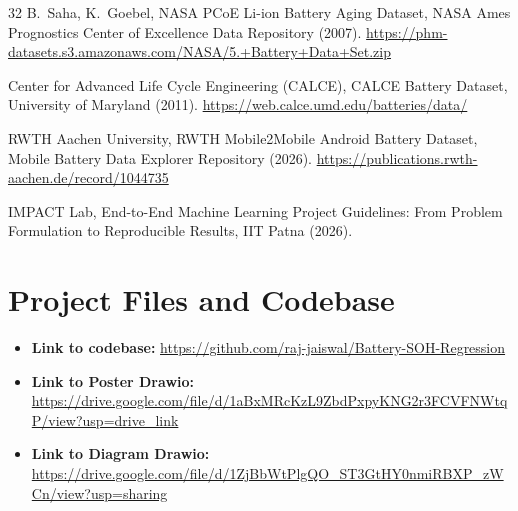 \documentclass[a4paper,fleqn]{cas-sc}
\begin{document}
\begin{thebibliography}{32}
B.~Saha, K.~Goebel, NASA PCoE Li-ion Battery Aging Dataset, NASA Ames Prognostics Center of Excellence Data Repository (2007). \url{https://phm-datasets.s3.amazonaws.com/NASA/5.+Battery+Data+Set.zip}

{Center for Advanced Life Cycle Engineering (CALCE)}, CALCE Battery Dataset, University of Maryland (2011). \url{https://web.calce.umd.edu/batteries/data/}

{RWTH Aachen University}, RWTH Mobile2Mobile Android Battery Dataset, Mobile Battery Data Explorer Repository (2026). \url{https://publications.rwth-aachen.de/record/1044735}

{IMPACT Lab}, End-to-End Machine Learning Project Guidelines: From Problem Formulation to Reproducible Results, IIT Patna (2026).

\end{thebibliography}

\appendix
\section{Project Files and Codebase}
\begin{itemize}
    \item \textbf{Link to codebase:} \url{https://github.com/raj-jaiswal/Battery-SOH-Regression}
    \item \textbf{Link to Poster Drawio:} \url{https://drive.google.com/file/d/1aBxMRcKzL9ZbdPxpyKNG2r3FCVFNWtqP/view?usp=drive_link}
    \item \textbf{Link to Diagram Drawio:} \url{https://drive.google.com/file/d/1ZjBbWtPlgQO_ST3GtHY0nmiRBXP_zWCn/view?usp=sharing}
\end{itemize}
\end{document}

